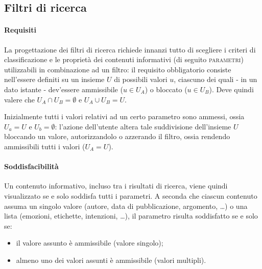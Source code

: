 \subsection{Filtri di ricerca}
\label{sec:tesi:stage:gui:filtri}
\paragraph{Requisiti}
La progettazione dei filtri di ricerca richiede innanzi tutto di scegliere i criteri di classificazione e le proprietà dei contenuti informativi (di seguito \textsc{parametri}) utilizzabili in combinazione ad un filtro: il requisito obbligatorio consiste nell'essere definiti su un insieme $U$ di possibili valori $u$, ciascuno dei quali - in un dato istante - dev'essere ammissibile ($u \in U_A$) o bloccato ($u \in U_B$). Deve quindi valere che $U_A \cap U_B = \emptyset$ e $U_A \cup U_B = U$.

Inizialmente tutti i valori relativi ad un certo parametro sono ammessi, ossia $U_a = U$ e $U_b = \emptyset$: l'azione dell'utente altera tale suddivisione dell'insieme $U$ bloccando un valore, autorizzandolo o azzerando il filtro, ossia rendendo ammissibili tutti i valori ($U_A = U$).

\paragraph{Soddisfacibilità}
Un contenuto informativo, incluso tra i risultati di ricerca, viene quindi visualizzato se e solo soddisfa tutti i parametri. A seconda che ciascun contenuto assuma un singolo valore (autore, data di pubblicazione, argomento, \ldots) o una lista (emozioni, etichette, intenzioni, \ldots), il parametro risulta soddisfatto se e solo se:
\begin{itemize}
\item il valore assunto è ammissibile (valore singolo);
\item almeno uno dei valori assunti è ammissibile (valori multipli).
\end{itemize}

